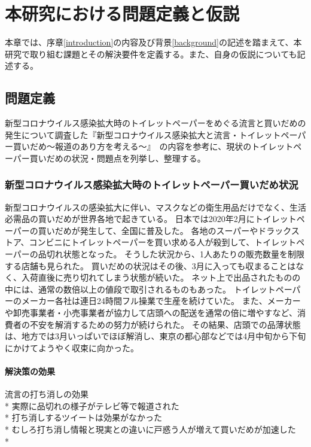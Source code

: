 \chapter{本研究における問題定義と仮説}
\label{issue}

本章では、序章\ref{introduction}の内容及び背景\ref{background}の記述を踏まえて、本研究で取り組む課題とその解決要件を定義する。また、自身の仮説についても記述する。

\section{問題定義}
新型コロナウイルス感染拡大時のトイレットペーパーをめぐる流言と買いだめの発生について調査した『新型コロナウイルス感染拡大と流言・トイレットペーパー買いだめ〜報道のあり方を考える〜』~\cite{現状}の内容を参考に、現状のトイレットペーパー買いだめの状況・問題点を列挙し、整理する。

\subsection{新型コロナウイルス感染拡大時のトイレットペーパー買いだめ状況}

新型コロナウイルスの感染拡大に伴い、マスクなどの衛生用品だけでなく、生活必需品の買いだめが世界各地で起きている。
日本では2020年2月にトイレットペーパーの買いだめが発生して、全国に普及した。
各地のスーパーやドラックストア、コンビニにトイレットペーパーを買い求める人が殺到して、トイレットペーパーの品切れ状態となった。
そうした状況から、1人あたりの販売数量を制限する店舗も見られた。
買いだめの状況はその後、3月に入っても収まることはなく、入荷直後に売り切れてしまう状態が続いた。
ネット上で出品されたものの中には、通常の数倍以上の値段で取引されるものもあった。
トイレットペーパーのメーカー各社は連日24時間フル操業で生産を続けていた。
また、メーカーや卸売事業者・小売事業者が協力して店頭への配送を通常の倍に増やすなど、消費者の不安を解消するための努力が続けられた。
その結果、店頭での品薄状態は、地方では3月いっぱいでほぼ解消し、東京の都心部などでは4月中旬から下旬にかけてようやく収束に向かった。

\subsubsection{解決策の効果}

流言の打ち消しの効果\\*
実際に品切れの様子がテレビ等で報道された\\*
打ち消しするツイートは効果がなかった\\*
むしろ打ち消し情報と現実との違いに戸惑う人が増えて買いだめが加速した\\*

